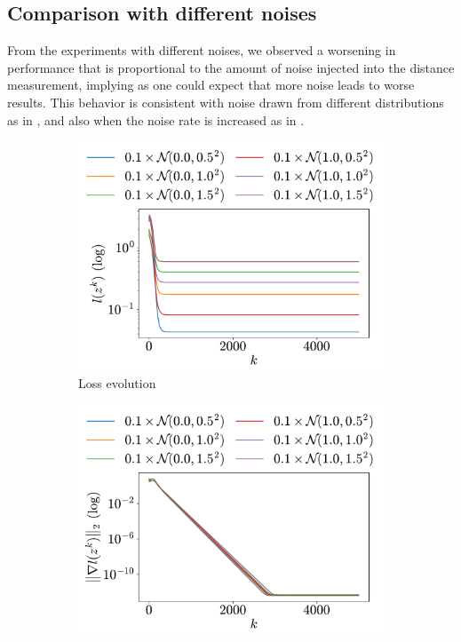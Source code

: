 \documentclass[a4paper,11pt,oneside]{book}
\begin{document}
\subsection{Comparison with different noises}

From the experiments with different noises, we observed a worsening in performance that is proportional to the amount of noise injected into the distance measurement, implying as one could expect that more noise leads to worse results. This behavior is consistent with noise drawn from different distributions as in , and also when the noise rate is increased as in .

\begin{figure}[htb!]
      \centering
      \begin{subfigure}[h]{0.43\linewidth}
            \centering
            \includegraphics[width=\linewidth]{./figs/tracking/gaussian/loss.pdf} 
            \caption{Loss evolution}
      \end{subfigure}
      \hfill
      \begin{subfigure}[h]{0.43\linewidth}
            \centering
            \includegraphics[width=\linewidth]{./figs/tracking/gaussian/gradient.pdf} 

\end{subfigure}
\end{figure}
\end{document}
